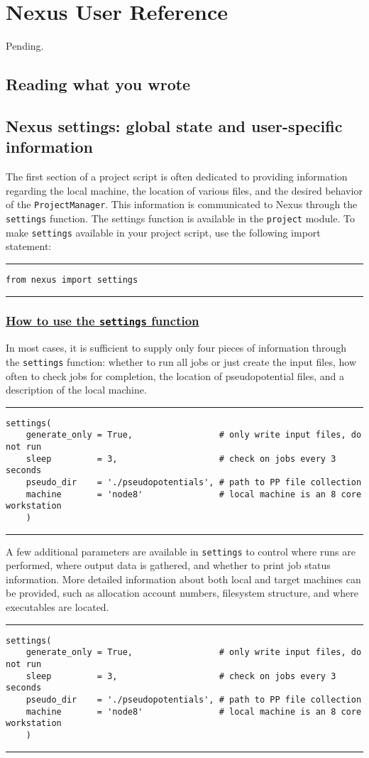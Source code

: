 \documentclass[oneside,11pt]{memoir}
\numberwithin{equation}{section}
\newcommand{\bu}[1]{\textbf{\underline{#1}}}
\newcommand{\HRule}{\rule{\linewidth}{0.5mm}}
\begin{document}
\pagebreak
\chapter{Nexus User Reference} \label{reference}
Pending.

\section{Reading what you wrote}

\section{Nexus settings: global state and user-specific information}
The first section of a project script is often dedicated to providing 
information regarding the local machine, the location of various files, and 
the desired behavior of the \texttt{ProjectManager}.  This information is 
communicated to Nexus through the \texttt{settings} function. 
The settings function is available in the \texttt{project} module.  To make 
\texttt{settings} available in your project script, use the following import 
statement:\newline
\HRule
\begin{verbatim}
from nexus import settings
\end{verbatim}
\HRule

\subsection{\bu{How to use the \texttt{settings} function}}
In most cases, it is sufficient to supply only four pieces of information 
through the \texttt{settings} function: whether to run all jobs or just create 
the input files, how often to check jobs for completion, the location of 
pseudopotential files, and a description of the local machine.
\HRule
\begin{verbatim}
settings(
    generate_only = True,                 # only write input files, do not run
    sleep         = 3,                    # check on jobs every 3 seconds
    pseudo_dir    = './pseudopotentials', # path to PP file collection
    machine       = 'node8'               # local machine is an 8 core workstation
    )
\end{verbatim}
\HRule

A few additional parameters are available in \texttt{settings} to control where 
runs are performed, where output data is gathered, and whether to print job 
status information.  More detailed information about both local and target 
machines can be provided, such as allocation account numbers, filesystem 
structure, and where executables are located.
\HRule
\begin{verbatim}
settings(
    generate_only = True,                 # only write input files, do not run
    sleep         = 3,                    # check on jobs every 3 seconds
    pseudo_dir    = './pseudopotentials', # path to PP file collection
    machine       = 'node8'               # local machine is an 8 core workstation
    )
\end{verbatim}
\HRule
\end{document}
